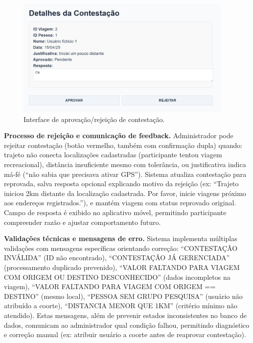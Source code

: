  
\begin{figure}[H]
    \centering
    \includegraphics[width=0.95\textwidth]{figuras/contestacao_aprovar.PNG}
    \caption{Interface de aprovação/rejeição de contestação.}
    \label{fig:contestacao_aprovar}
  \end{figure}

\textbf{Processo de rejeição e comunicação de feedback.} Administrador pode rejeitar contestação (botão vermelho, também com confirmação dupla) quando: trajeto não conecta localizações cadastradas (participante tentou viagem recreacional), distância insuficiente mesmo com tolerância, ou justificativa indica má-fé (``não sabia que precisava ativar GPS''). Sistema atualiza contestação para reprovada, salva resposta opcional explicando motivo da rejeição (ex: ``Trajeto iniciou 2km distante da localização cadastrada. Por favor, inicie viagens próximo aos endereços registrados.''), e mantém viagem com status reprovado original. Campo de resposta é exibido no aplicativo móvel, permitindo participante compreender razão e ajustar comportamento futuro.

\textbf{Validações técnicas e mensagens de erro.} Sistema implementa múltiplas validações com mensagens específicas orientando correção: ``CONTESTAÇÃO INVÁLIDA'' (ID não encontrado), ``CONTESTAÇÃO JÁ GERENCIADA'' (processamento duplicado prevenido), ``VALOR FALTANDO PARA VIAGEM COM ORIGEM OU DESTINO DESCONHECIDO'' (dados incompletos na viagem), ``VALOR FALTANDO PARA VIAGEM COM ORIGEM == DESTINO'' (mesmo local), ``PESSOA SEM GRUPO PESQUISA'' (usuário não atribuído a coorte), ``DISTANCIA MENOR QUE 1KM'' (critério mínimo não atendido). Estas mensagens, além de prevenir estados inconsistentes no banco de dados, comunicam ao administrador qual condição falhou, permitindo diagnóstico e correção manual (ex: atribuir usuário a coorte antes de reaprovar contestação).
